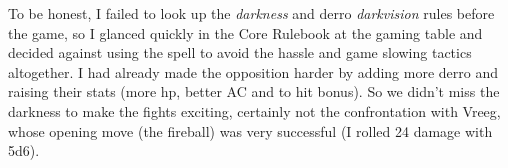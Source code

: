 To be honest, I failed to look up the {\itshape darkness} and derro  {\itshape darkvision} rules before the game, so I glanced quickly in the Core Rulebook at the gaming table and decided against using the spell to avoid the hassle and game slowing tactics altogether. I had already made the opposition harder by adding more derro and raising their stats (more hp, better AC and to hit bonus). So we didn't miss the darkness to make the fights exciting, certainly not the confrontation with Vreeg, whose opening move (the fireball) was very successful (I rolled 24 damage with 5d6). 